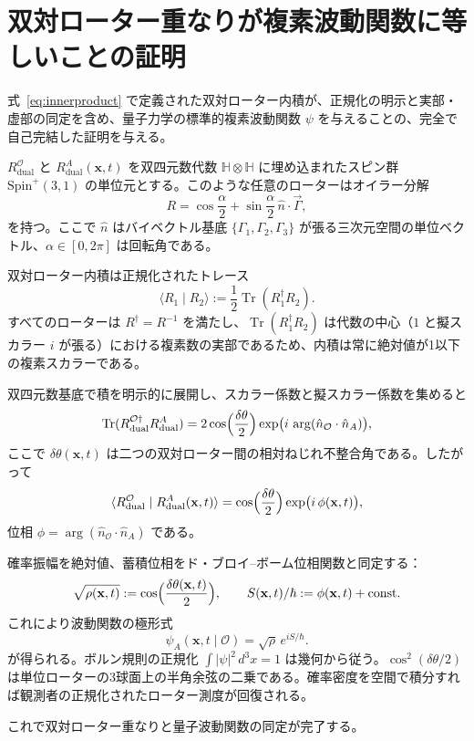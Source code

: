 \documentclass[a4paper]{article}
\begin{document}
\appendix
\section{双対ローター重なりが複素波動関数に等しいことの証明}

式~\eqref{eq:innerproduct} で定義された双対ローター内積が、正規化の明示と実部・虚部の同定を含め、量子力学の標準的複素波動関数 \(\psi\) を与えることの、完全で自己完結した証明を与える。

\( R_{\text{dual}}^{\mathcal{O}} \) と \( R_{\text{dual}}^{A}(\mathbf{x},t) \) を双四元数代数 \(\mathbb{H}\otimes\mathbb{H}\) に埋め込まれたスピン群 \(\mathrm{Spin}^+(3,1)\) の単位元とする。このような任意のローターはオイラー分解
\[
R = \cos\frac{\alpha}{2} + \sin\frac{\alpha}{2}\, \hat{n}\cdot\vec{\Gamma},
\]
を持つ。ここで \(\hat{n}\) はバイベクトル基底 \(\{\Gamma_1,\Gamma_2,\Gamma_3\}\) が張る三次元空間の単位ベクトル、\(\alpha\in[0,2\pi]\) は回転角である。

双対ローター内積は正規化されたトレース
\[
\langle R_1 \mid R_2 \rangle := \frac12 \operatorname{Tr}(R_1^\dagger R_2).
\]
すべてのローターは \(R^\dagger = R^{-1}\) を満たし、\(\operatorname{Tr}(R_1^\dagger R_2)\) は代数の中心（\(1\) と擬スカラー \(i\) が張る）における複素数の実部であるため、内積は常に絶対値が1以下の複素スカラーである。

双四元数基底で積を明示的に展開し、スカラー係数と擬スカラー係数を集めると
\[
\operatorname{Tr}(R_{\text{dual}}^{\mathcal{O}\dagger} R_{\text{dual}}^A) = 2\cos\Bigl(\frac{\delta\theta}{2}\Bigr)\exp\bigl(i\,\arg(\hat{n}_{\mathcal{O}}\cdot\hat{n}_A)\bigr),
\]
ここで \(\delta\theta(\mathbf{x},t)\) は二つの双対ローター間の相対ねじれ不整合角である。したがって
\[
\langle R_{\text{dual}}^{\mathcal{O}} \mid R_{\text{dual}}^{A}(\mathbf{x},t) \rangle = \cos\Bigl(\frac{\delta\theta}{2}\Bigr)\exp\bigl(i\,\phi(\mathbf{x},t)\bigr),
\]
位相 \(\phi = \arg(\hat{n}_{\mathcal{O}}\cdot\hat{n}_A)\) である。

確率振幅を絶対値、蓄積位相をド・ブロイ--ボーム位相関数と同定する：
\[
\sqrt{\rho(\mathbf{x},t)} := \cos\Bigl(\frac{\delta\theta(\mathbf{x},t)}{2}\Bigr),\qquad
S(\mathbf{x},t)/\hbar := \phi(\mathbf{x},t) + \text{const}.
\]
これにより波動関数の極形式
\[
\psi_A(\mathbf{x},t\mid\mathcal{O}) = \sqrt{\rho}\,e^{i S/\hbar}.
\]
が得られる。ボルン規則の正規化 \(\int|\psi|^2\,d^3x=1\) は幾何から従う。\(\cos^2(\delta\theta/2)\) は単位ローターの3球面上の半角余弦の二乗である。確率密度を空間で積分すれば観測者の正規化されたローター測度が回復される。

これで双対ローター重なりと量子波動関数の同定が完了する。
\end{document}
